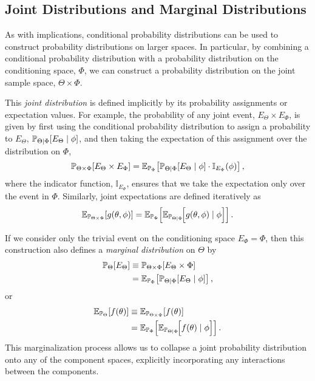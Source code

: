 \subsection{Joint Distributions and Marginal Distributions}

As with implications, conditional probability distributions can be used
to construct probability distributions on larger spaces.  In particular,
by combining a conditional probability distribution with a probability distribution 
on the conditioning space, $\Phi$, we can construct a probability distribution 
on the joint sample space, $\Theta \times \Phi$.  

This \emph{joint distribution} is defined implicitly by its probability assignments 
or expectation values.  For example, the probability of any joint event, 
$E_{\Theta} \times E_{\Phi}$, is given by first using the conditional probability 
distribution to assign a probability 
to $E_{\Theta}$, $\mathbb{P}_{\Theta|\Phi} \! \left[ E_{\Theta} \mid \phi \right]$, and 
then taking the expectation of this assignment over the distribution on $\Phi$,
%
\begin{equation*}
\mathbb{P}_{\Theta \times \Phi} \! \left[ E_{\Theta} \times E_{\Phi} \right]
=
\mathbb{E}_{\mathbb{P}_{\Phi}} \! \left[  
\mathbb{P}_{\Theta|\Phi} \! \left[ E_{\Theta} \mid \phi \right] 
\cdot \mathbb{I}_{E_{\Phi}} \! \left( \phi \right)
\right],
\end{equation*}
%
where the indicator function, $\mathbb{I}_{E_{\Phi}}$, ensures that we 
take the expectation only over the event in $\Phi$.  Similarly, joint 
expectations are defined iteratively as
%
\begin{equation*}
\mathbb{E}_{\mathbb{P}_{\Theta \times \Phi}} \! \left[ g \! \left( \theta, \phi \right) \right]
=
\mathbb{E}_{\mathbb{P}_{\Phi}} \! \left[  
\mathbb{E}_{\mathbb{P}_{\Theta|\Phi}} \! \Big[ 
g \! \left( \theta, \phi \right) \mid \phi 
\Big]
\right].
\end{equation*}

If we consider only the trivial event on the conditioning space $E_{\Phi} 
= \Phi$, then this construction also defines a  \emph{marginal distribution} 
on $\Theta$ by
%
\begin{align*}
\mathbb{P}_{\Theta} \! \left[ E_{\Theta} \right]
&\equiv
\mathbb{P}_{\Theta \times \Phi} \! \left[ E_{\Theta} \times \Phi \right] \\
&=
\mathbb{E}_{\mathbb{P}_{\Phi}} \! \left[  
\mathbb{P}_{\Theta|\Phi} \! \left[ E_{\Theta} \mid \phi \right]
\right],
\end{align*}
or
%
\begin{align*}
\mathbb{E}_{\mathbb{P}_{\Theta}} \! \left[ f \! \left( \theta \right) \right]
&\equiv
\mathbb{E}_{\mathbb{P}_{\Theta \times \Phi}} \! \left[ f \! \left( \theta \right) \right] \\
&=
\mathbb{E}_{\mathbb{P}_{\Phi}} \! \left[  
\mathbb{E}_{\mathbb{P}_{\Theta|\Phi}} \! \Big[ 
f \! \left( \theta \right) \mid \phi 
\Big]
\right].
\end{align*}
%
This marginalization process allows us to collapse a joint probability 
distribution onto any of the component spaces, explicitly incorporating 
any interactions between the components.

